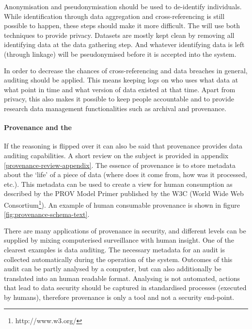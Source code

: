 Anonymisation and pseudonymisation should be used to de-identify individuals.
While identification through data aggregation and cross-referencing is still possible to happen, these steps should make it more difficult.
The \ivfsystem{} will use both techniques to provide privacy. Datasets are mostly kept clean by removing all identifying data at the data gathering step.
And whatever identifying data is left (through linkage) will be pseudonymised before it is accepted into the system.

In order to decrease the chances of cross-referencing and data breaches in general, auditing should be applied.
This means keeping logs on who uses what data at what point in time and what version of data existed at that time.
Apart from privacy, this also makes it possible to keep people accountable and to provide research data management functionalities such as archival and provenance.

\paragraph{Provenance and the \ivfsystem{}}
If the reasoning is flipped over it can also be said that provenance provides data auditing capabilities.
A short review on the subject is provided in appendix \ref{provenance-review-appendix}.
The essence of provenance is to store metadata about the `life' of a piece of data (where does it come from, how was it processed, etc.).
This metadata can be used to create a view for human consumption as described by the PROV Model Primer \cite{dsp8gil} published by the W3C (World Wide Web Consortium\footnote{http://www.w3.org/}).
An example of human consumable provenance is shown in figure \ref{fig:provenance-schema-text}.

There are many applications of provenance in security, and  different levels can be supplied by mixing computerised surveillance with human insight.
One of the clearest examples is  data auditing.
The necessary metadata for an audit is collected automatically during the operation of the system.
Outcomes of this audit can be partly analysed by a computer, but can also additionally be translated into an human readable format.
Analysing is not automated, actions that lead to data security should be captured in standardised processes (executed by humans), therefore provenance is only a tool and not a security end-point.

